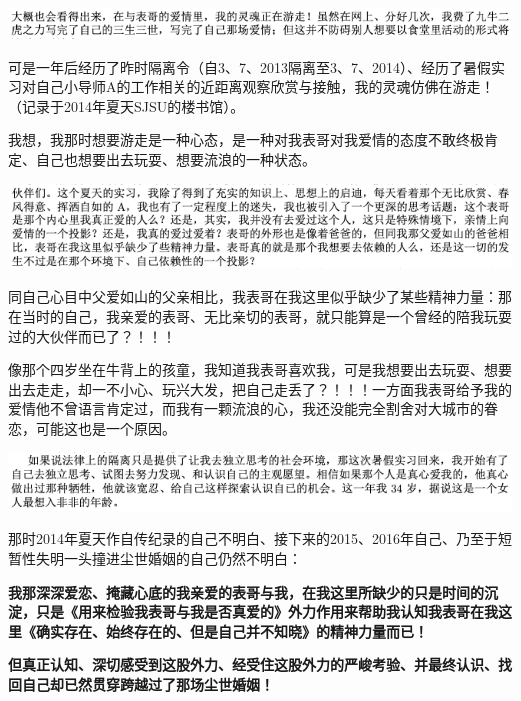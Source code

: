 \documentclass[9pt, b5paper]{article}
\begin{document}
\begin{center}
\includegraphics[width=.9\linewidth]{./pic/backups_plans_20210426_113704.png}
\end{center}

可是一年后经历了昨时隔离令（自3、7、2013隔离至3、7、2014）、经历了暑假实习对自己小导师A的工作相关的近距离观察欣赏与接触，我的灵魂仿佛在游走！（记录于2014年夏天SJSU的楼书馆）。

我想，我那时想要游走是一种心态，是一种对我表哥对我爱情的态度不敢终极肯定、自己也想要出去玩耍、想要流浪的一种状态。

\begin{center}
\includegraphics[width=.9\linewidth]{./pic/backups_plans_20210422_075555.png}
\end{center}

同自己心目中父爱如山的父亲相比，我表哥在我这里似乎缺少了某些精神力量：那在当时的自己，我亲爱的表哥、无比亲切的表哥，就只能算是一个曾经的陪我玩耍过的大伙伴而已了？！！！

像那个四岁坐在牛背上的孩童，我知道我表哥喜欢我，可是我想要出去玩耍、想要出去走走，却一不小心、玩兴大发，把自己走丢了？！！！一方面我表哥给予我的爱情他不曾语言肯定过，而我有一颗流浪的心，我还没能完全割舍对大城市的眷恋，可能这也是一个原因。

\begin{center}
\includegraphics[width=.9\linewidth]{./pic/backups_plans_20210422_075830.png}
\end{center}

那时2014年夏天作自传纪录的自己不明白、接下来的2015、2016年自己、乃至于短暂性失明一头撞进尘世婚姻的自己仍然不明白：

\textbf{我那深深爱恋、掩藏心底的我亲爱的表哥与我，在我这里所缺少的只是时间的沉淀，只是《用来检验我表哥与我是否真爱的》外力作用来帮助我认知我表哥在我这里《确实存在、始终存在的、但是自己并不知晓》的精神力量而已！}

\textbf{但真正认知、深切感受到这股外力、经受住这股外力的严峻考验、并最终认识、找回自己却已然贯穿跨越过了那场尘世婚姻！}
\end{document}
